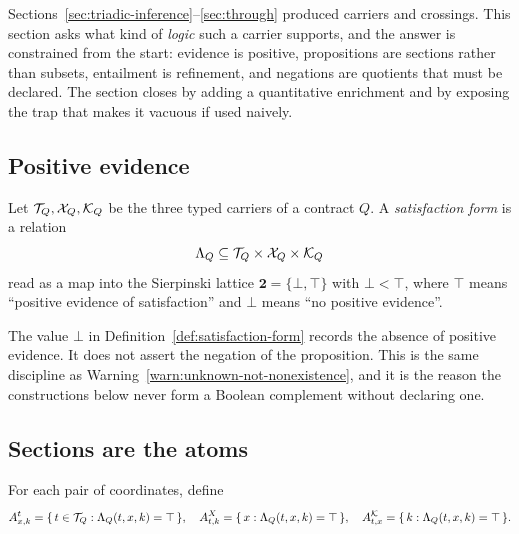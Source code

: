 \label{sec:satisfaction-body}

Sections~\ref{sec:triadic-inference}--\ref{sec:through} produced carriers and crossings.
This section asks what kind of \emph{logic} such a carrier supports, and the answer is
constrained from the start: evidence is positive, propositions are sections rather than
subsets, entailment is refinement, and negations are quotients that must be declared.
The section closes by adding a quantitative enrichment and by exposing the trap that
makes it vacuous if used naively.

\subsection{Positive evidence}

\begin{definition}\label{def:satisfaction-form}
Let $\mathcal T_Q,\mathcal X_Q,\mathcal K_Q$ be the three typed carriers of a contract $Q$.  A
\emph{satisfaction form} is a relation
\[
  \Lambda_Q\subseteq \mathcal T_Q\times\mathcal X_Q\times\mathcal K_Q
\]
read as a map into the Sierpinski lattice $\mathbf 2=\{\bot,\top\}$ with
$\bot<\top$, where $\top$ means ``positive evidence of satisfaction'' and $\bot$ means
``no positive evidence''.
\end{definition}

\begin{warning}\label{warn:bottom-not-false}
The value $\bot$ in Definition~\ref{def:satisfaction-form} records the absence of
positive evidence.  It does not assert the negation of the proposition.  This is the
same discipline as Warning~\ref{warn:unknown-not-nonexistence}, and it is the reason the
constructions below never form a Boolean complement without declaring one.
\end{warning}

\subsection{Sections are the atoms}

\begin{definition}\label{def:opposite-pair-sections}
For each pair of coordinates, define
\[
  A^{t}_{x,k}=\{\,t\in\mathcal T_Q:\Lambda_Q(t,x,k)=\top\,\},\quad
  A^{X}_{t,k}=\{\,x:\Lambda_Q(t,x,k)=\top\,\},\quad
  A^{\mathcal K}_{t,x}=\{\,k:\Lambda_Q(t,x,k)=\top\,\}.
\]
\end{definition}

